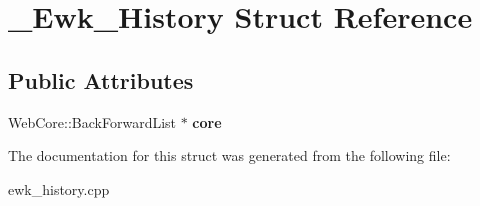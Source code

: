 \hypertarget{struct__Ewk__History}{\section{\+\_\+\+Ewk\+\_\+\+History Struct Reference}
\label{struct__Ewk__History}
}
\subsection*{Public Attributes}
\begin{DoxyCompactItemize}
\item 
\hypertarget{struct__Ewk__History_af3790bbd947b3c75d7d001568761d70c}{Web\+Core\+::\+Back\+Forward\+List $\ast$ {\bfseries core}}\label{struct__Ewk__History_af3790bbd947b3c75d7d001568761d70c}

\end{DoxyCompactItemize}


The documentation for this struct was generated from the following file\+:\begin{DoxyCompactItemize}
\item 
ewk\+\_\+history.\+cpp\end{DoxyCompactItemize}
